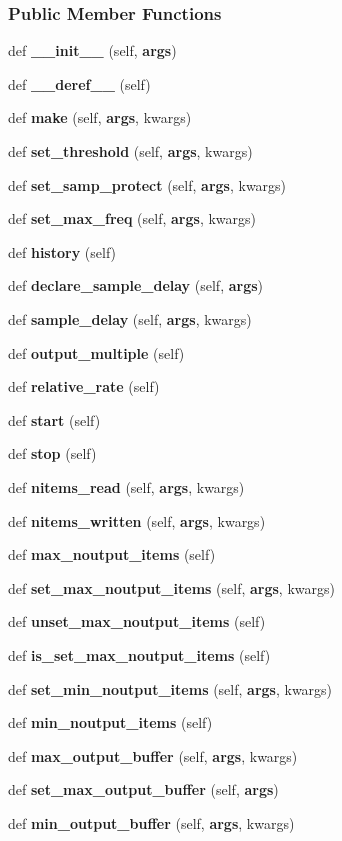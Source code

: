 \subsubsection*{Public Member Functions}
\begin{DoxyCompactItemize}
\item 
def {\bf \+\_\+\+\_\+init\+\_\+\+\_\+} (self, {\bf args})
\item 
def {\bf \+\_\+\+\_\+deref\+\_\+\+\_\+} (self)
\item 
def {\bf make} (self, {\bf args}, kwargs)
\item 
def {\bf set\+\_\+threshold} (self, {\bf args}, kwargs)
\item 
def {\bf set\+\_\+samp\+\_\+protect} (self, {\bf args}, kwargs)
\item 
def {\bf set\+\_\+max\+\_\+freq} (self, {\bf args}, kwargs)
\item 
def {\bf history} (self)
\item 
def {\bf declare\+\_\+sample\+\_\+delay} (self, {\bf args})
\item 
def {\bf sample\+\_\+delay} (self, {\bf args}, kwargs)
\item 
def {\bf output\+\_\+multiple} (self)
\item 
def {\bf relative\+\_\+rate} (self)
\item 
def {\bf start} (self)
\item 
def {\bf stop} (self)
\item 
def {\bf nitems\+\_\+read} (self, {\bf args}, kwargs)
\item 
def {\bf nitems\+\_\+written} (self, {\bf args}, kwargs)
\item 
def {\bf max\+\_\+noutput\+\_\+items} (self)
\item 
def {\bf set\+\_\+max\+\_\+noutput\+\_\+items} (self, {\bf args}, kwargs)
\item 
def {\bf unset\+\_\+max\+\_\+noutput\+\_\+items} (self)
\item 
def {\bf is\+\_\+set\+\_\+max\+\_\+noutput\+\_\+items} (self)
\item 
def {\bf set\+\_\+min\+\_\+noutput\+\_\+items} (self, {\bf args}, kwargs)
\item 
def {\bf min\+\_\+noutput\+\_\+items} (self)
\item 
def {\bf max\+\_\+output\+\_\+buffer} (self, {\bf args}, kwargs)
\item 
def {\bf set\+\_\+max\+\_\+output\+\_\+buffer} (self, {\bf args})
\item 
def {\bf min\+\_\+output\+\_\+buffer} (self, {\bf args}, kwargs)

\end{DoxyCompactItemize}
